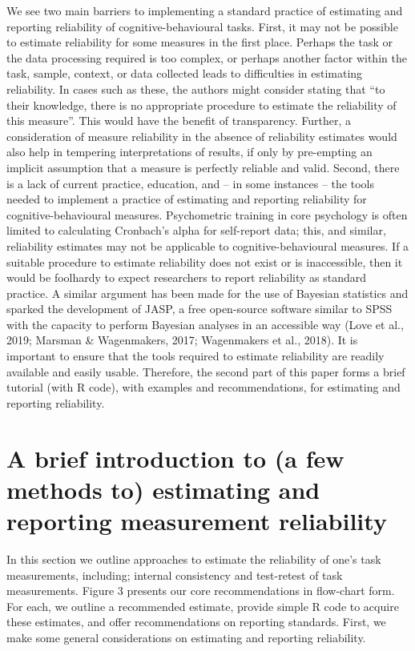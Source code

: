 \documentclass[english,,man,floatsintext]{apa6}
\begin{document}
We see two main barriers to implementing a standard practice of estimating and reporting reliability of cognitive-behavioural tasks. First, it may not be possible to estimate reliability for some measures in the first place. Perhaps the task or the data processing required is too complex, or perhaps another factor within the task, sample, context, or data collected leads to difficulties in estimating reliability. In cases such as these, the authors might consider stating that \enquote{to their knowledge, there is no appropriate procedure to estimate the reliability of this measure}. This would have the benefit of transparency. Further, a consideration of measure reliability in the absence of reliability estimates would also help in tempering interpretations of results, if only by pre-empting an implicit assumption that a measure is perfectly reliable and valid. Second, there is a lack of current practice, education, and -- in some instances -- the tools needed to implement a practice of estimating and reporting reliability for cognitive-behavioural measures. Psychometric training in core psychology is often limited to calculating Cronbach's alpha for self-report data; this, and similar, reliability estimates may not be applicable to cognitive-behavioural measures. If a suitable procedure to estimate reliability does not exist or is inaccessible, then it would be foolhardy to expect researchers to report reliability as standard practice. A similar argument has been made for the use of Bayesian statistics and sparked the development of JASP, a free open-source software similar to SPSS with the capacity to perform Bayesian analyses in an accessible way (Love et al., 2019; Marsman \& Wagenmakers, 2017; Wagenmakers et al., 2018). It is important to ensure that the tools required to estimate reliability are readily available and easily usable. Therefore, the second part of this paper forms a brief tutorial (with R code), with examples and recommendations, for estimating and reporting reliability.

\hypertarget{a-brief-introduction-to-a-few-methods-to-estimating-and-reporting-measurement-reliability}{%
\section{A brief introduction to (a few methods to) estimating and reporting measurement reliability}\label{a-brief-introduction-to-a-few-methods-to-estimating-and-reporting-measurement-reliability}}

In this section we outline approaches to estimate the reliability of one's task measurements, including; internal consistency and test-retest of task measurements. Figure 3 presents our core recommendations in flow-chart form. For each, we outline a recommended estimate, provide simple R code to acquire these estimates, and offer recommendations on reporting standards. First, we make some general considerations on estimating and reporting reliability.
\end{document}
